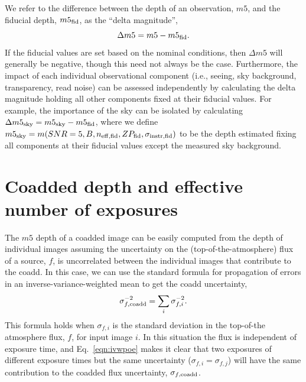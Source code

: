 \documentclass[DM,authoryear,toc]{lsstdoc}
\begin{document}
We refer to the difference between the depth of an observation, $m5$, and the fiducial depth, $m5_{\rm fid}$, as the ``delta magnitude'', 
\begin{equation}
    \Delta m5 =  m5 - m5_{\rm fid}.
\end{equation}
If the fiducial values are set based on the nominal conditions, then $\Delta m5$ will generally be negative, though this need not always be the case. Furthermore, the impact  of each individual observational component (i.e., seeing, sky background, transparency, read noise) can be assessed independently by calculating the delta magnitude holding all other components fixed at their fiducial values. For example, the importance of the sky can be isolated by calculating
$\Delta m5_{\rm sky} = m5_{\rm sky} - m5_{\rm fid}$,
where we define $m5_{\rm sky} = m(SNR=5, B, n_{\rm eff,fid}, ZP_{\rm fid}, \sigma_{\rm instr,fid})$ to be the depth estimated fixing all components at their fiducial values except the measured sky background.


\section{Coadded depth and effective number of exposures}
\label{sec:coadd_depth}


The $m5$ depth of a coadded image can be easily computed from the depth of individual images assuming the uncertainty on the (top-of-the-atmosphere) flux of a source, $f$, is uncorrelated between the individual images that contribute to the coadd. In this case, we can use the standard formula for propagation of errors in an inverse-variance-weighted mean to get the coadd uncertainty,
\begin{equation}
\label{eqn:ivwpoe}
\sigma_{f,\rm{coadd}}^{-2} = \sum_i \sigma_{f,i}^{-2}.
\end{equation}
This formula holds when $\sigma_{f,i}$ is the standard deviation in the top-of-the atmosphere flux, $f$, for input image $i$.
In this situation the flux is independent of exposure time, and Eq.~\ref{eqn:ivwpoe} makes it clear that two exposures of different exposure times but the same uncertainty ($\sigma_{f,i} = \sigma_{f,j}$) will have the same contribution to the coadded flux uncertainty, $\sigma_{f, {\rm coadd}}$.
\end{document}
